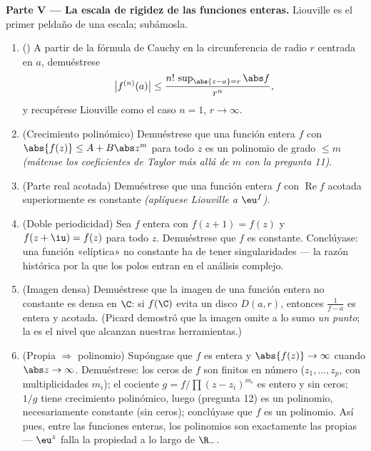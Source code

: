 \begin{problem}
\medskip
\noindent\textbf{Parte V --- La escala de rigidez de las funciones
enteras.} Liouville es el primer peldaño de una escala; subámosla.
\begin{enumerate}[resume]
  \item () A
  partir de la fórmula de Cauchy en la circunferencia de radio $r$
  centrada en $a$, demuéstrese
        \[
        \bigl|f^{(n)}(a)\bigr| \leq
        \frac{n!\,\sup_{\abs{z-a}=r}\abs f}{r^n} ,
        \]
        y recupérese Liouville como el caso $n = 1$, $r \to
        \infty$. \item (Crecimiento polinómico) Demuéstrese que una
        función entera $f$ con $\abs{f(z)} \leq A + B\abs z^m$ para todo
        $z$ es un polinomio de grado $\leq m$ \emph{(mátense los
        coeficientes de Taylor más allá de $m$ con la pregunta 11)}.
        \item (Parte real acotada) Demuéstrese que una función entera
        $f$ con $\operatorname{Re}f$ acotada superiormente es constante
        \emph{(aplíquese Liouville a $\eu^{f}$)}. \item (Doble
        periodicidad) Sea $f$ entera con $f(z + 1)
        = f(z)$ y $f(z + \iu) = f(z)$ para todo $z$. Demuéstrese que $f$
        es constante. Conclúyase: una función «elíptica» no constante ha
        de tener singularidades --- la razón histórica por la que los
        polos entran en el análisis complejo. \item (Imagen densa)
        Demuéstrese que la imagen de una función entera no constante es
        densa en $\C$: si $f(\C)$ evita un disco $D(a, r)$, entonces
        $\frac1{f - a}$ es entera y acotada. (Picard demostró que la
        imagen omite a lo sumo \emph{un punto}; la
         es el nivel que alcanzan
        nuestras herramientas.) \item (Propia $\Rightarrow$ polinomio)
        Supóngase que $f$ es entera y $\abs{f(z)} \to \infty$ cuando
        $\abs z \to
        \infty$. Demuéstrese: los ceros de $f$ son finitos en número
        ($z_1, \dots, z_p$, con multiplicidades $m_i$); el cociente
        $g = f/\prod(z - z_i)^{m_i}$ es entero y sin ceros; $1/g$ tiene
        crecimiento polinómico, luego (pregunta 12) es un polinomio,
        necesariamente constante (sin ceros); conclúyase que $f$ es un
        polinomio. Así pues, entre las funciones enteras, los polinomios
        son exactamente las propias --- $\eu^z$ falla la propiedad a lo
        largo de
        $\R_-$.
\end{enumerate}


\end{problem}
